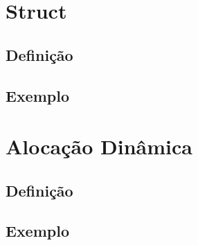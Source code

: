 \documentclass{article}
\begin{document}
    \section{Struct}
    \subsection{Definição}
    \subsection*{Exemplo}
    \newpage

    \section{Alocação Dinâmica}
    \subsection{Definição}
    \subsection*{Exemplo}
\end{document}
